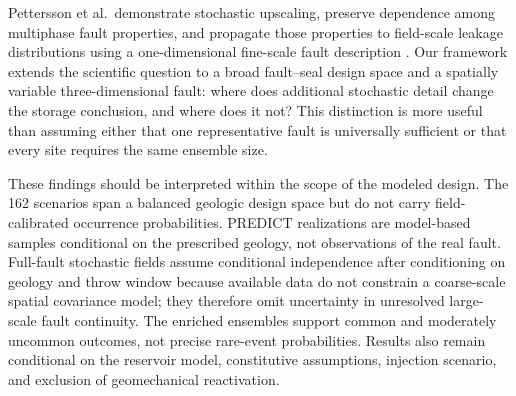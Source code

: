 Pettersson et al.\ demonstrate stochastic upscaling, preserve dependence among
multiphase fault properties, and propagate those properties to field-scale
leakage distributions using a one-dimensional fine-scale fault description
\cite{Pettersson2025}. Our framework extends the scientific question to a
broad fault--seal design space and a spatially variable three-dimensional
fault: where does additional stochastic detail change the storage conclusion,
and where does it not? This distinction is more useful than assuming either
that one representative fault is universally sufficient or that every site
requires the same ensemble size.

These findings should be interpreted within the scope of the modeled design.
The 162 scenarios span a balanced geologic design space but do not carry
field-calibrated occurrence probabilities. PREDICT realizations are
model-based samples conditional on the prescribed geology, not observations
of the real fault. Full-fault stochastic fields assume conditional
independence after conditioning on geology and throw window because available
data do not constrain a coarse-scale spatial covariance model; they therefore
omit uncertainty in unresolved large-scale fault continuity. The enriched
ensembles support common and moderately uncommon outcomes, not precise
rare-event probabilities. Results also remain conditional on the reservoir
model, constitutive assumptions, injection scenario, and exclusion of
geomechanical reactivation.
